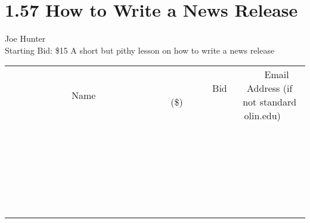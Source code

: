 \documentclass[11pt]{article}
\begin{document}
\section*{1.57 How to Write a News Release }
Joe Hunter
\\
Starting Bid: \$15
\newline
A short but pithy lesson on how to write a news release
\\[6ex]
\begin{tabular}{c c c}
~~~~~~~~~~~~~Name~~~~~~~~~~~~~ & ~~~~~~~~~Bid (\$)~~~~~~~~~  & ~~~Email Address (if not standard olin.edu)~~~\\
 & & \\
\hline
 & & \\
\hline
 & & \\
\hline
 & & \\
\hline
 & & \\
\hline
 & & \\
\hline
 & & \\
\hline
 & & \\
\hline
 & & \\
\hline
 & & \\
\hline
 & & \\
\hline
 & & \\
\hline
 & & \\
\hline
 & & \\
\hline
 & & \\
\hline
 & & \\
\hline
 & & \\
\hline
 & & \\
\hline
 & & \\
\hline
 & & \\
\hline
 & & \\
\hline
 & & \\
\hline
 & & \\
\hline
 & & \\
\hline
 & & \\
\hline
 & & \\
\hline
\end{tabular}
\newpage
\end{document}
